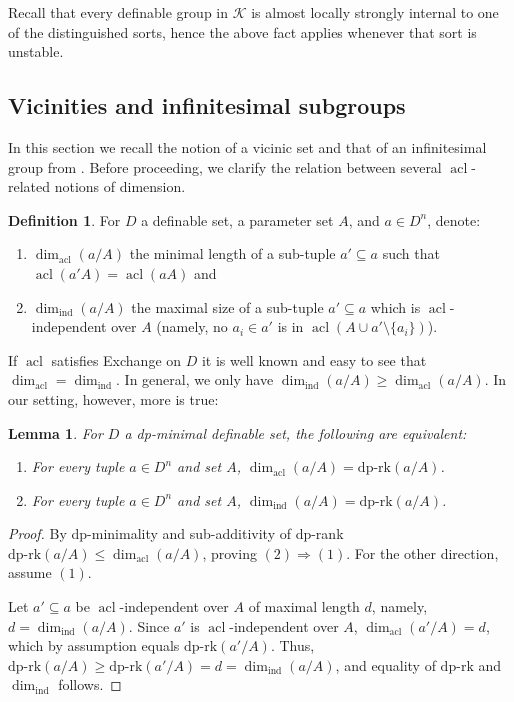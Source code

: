 \documentclass[11pt]{amsart}
\DeclareMathOperator{\acl}{acl}
\newtheorem{lemma}[theorem]{Lemma}
\theoremstyle{definition}
\newtheorem{definition}[theorem]{Definition}
\newcommand{\CK}{{\mathcal K}}
\newcommand{\0}{\emptyset}
\def\dpr{\mathrm{dp\text{-}rk}}
\def\sub{\subseteq}
\begin{document}
Recall that every definable group in $\CK$ is almost locally strongly internal to one of  the distinguished sorts, hence the above fact applies whenever that sort is unstable.


 \subsection{Vicinities and  infinitesimal subgroups}\label{ss:infint and vicin}

 In this section we recall the notion of a vicinic set and that of an infinitesimal group from \cite{HaHaPeGps}. Before proceeding, we  clarify the relation between several  $\acl$-related notions of dimension.

 \begin{definition}
For $D$ a definable set, a parameter set $A$, and $a\in D^n$, denote:
\begin{enumerate}
    \item $\dim_{\acl}(a/A)$ the minimal length of a sub-tuple $a'\sub a$ such that $\acl(a'A)=\acl(aA)$ and %
    \item $\dim_{\mathrm{ind}}(a/A)$  the maximal size of a sub-tuple $a'\sub a$ which is $\acl$-independent over $A$  (namely, no $a_i\in a'$ is in $\acl(A\cup a'\setminus \{a_i\})$).
\end{enumerate}
 \end{definition}

If $\acl$ satisfies Exchange on $D$ it is well known and easy to see that $\dim_{\acl}=\dim_{
  \mathrm{ind}}$. In general, we only have  $\dim_{\mathrm{ind}}(a/A)\geq \dim_{\acl}(a/A)$. In our setting, however, more is true: 

\begin{lemma}
    For $D$ a dp-minimal definable set, the following are equivalent:
    \begin{enumerate}
        \item For every tuple $a\in D^n$ and set $A$, $\dim_{\acl}(a/A)=\dpr(a/A)$.
        \item For every tuple $a\in D^n$ and set $A$, $\dim_{\mathrm{ind}}(a/A)=\dpr(a/A)$.
    \end{enumerate}
\end{lemma}
\begin{proof}
    By dp-minimality and sub-additivity of dp-rank  $\dpr(a/A)\leq \dim_{\acl}(a/A)$, proving  $(2)\Rightarrow (1)$. For the other direction,  assume $(1)$.

Let $a'\sub a$ be $\acl$-independent over $A$ of maximal length $d$, namely, $d=\dim_{\mathrm{ind}}(a/A)$. Since $a'$ is $\acl$-independent over $A$, $\dim_{\acl}(a'/A)=d$, which by assumption equals $\dpr(a'/A)$. Thus, $\dpr(a/A)\geq \dpr(a'/A)=d=\dim_{\mathrm{ind}}(a/A)$, and equality of $\dpr$ and $\dim_{\mathrm{ind}}$ follows.
\end{proof}
\end{document}
